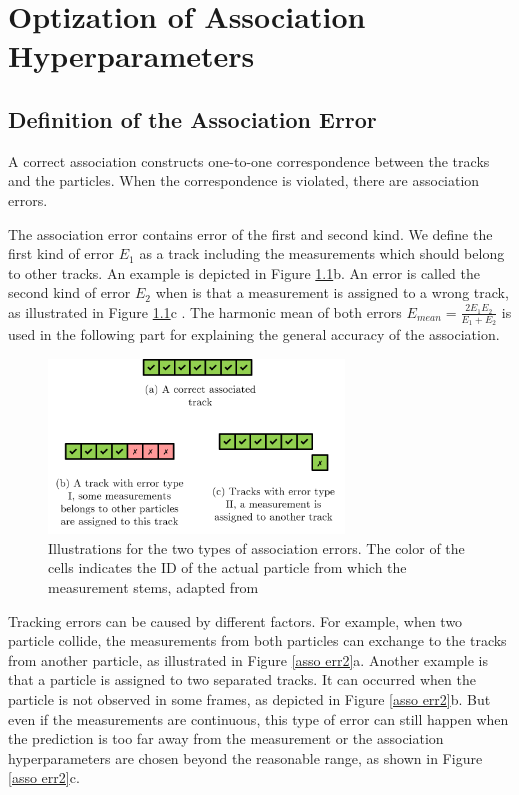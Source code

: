 \chapter{Optization of Association Hyperparameters}

\section{Definition of the Association Error}


A correct association constructs one-to-one correspondence between the tracks and the particles. When the correspondence is violated, there are association errors.

The association error contains error of the first and second kind. We define the first kind of error $E_{1}$ as a track including the measurements which should belong to other tracks. An example
is depicted in Figure \ref{asso err}b. An error is called the second kind of error $E_{2}$ when is that a measurement is assigned to a wrong track, as illustrated in Figure \ref{asso err}c \cite{pfaff2019multitarget}. The harmonic mean of both errors $E_{mean}=\frac{2E_{1}E_{2}}{E_{1}+E_{2}}$ is used in  the following part for explaining the general accuracy of the association. 


\begin{figure}[htbp]
\centering
\includegraphics[width=0.7\textwidth]{figures/Asso/association error.png}
\caption{Illustrations for the two types of association errors. The  color of the cells indicates the ID of the actual particle from which the measurement stems, adapted from \cite{pfaff2019multitarget}}
\label{asso err}
\end{figure}

Tracking errors can be caused by different factors. For example, when two particle collide, the measurements from both particles can exchange to the tracks from another particle, as illustrated in Figure \ref{asso err2}a. Another example is that a particle is assigned to two separated tracks. It can occurred when the particle is not observed in some frames, as depicted in Figure \ref{asso err2}b. But even if the measurements are continuous, this type of error can still happen when the prediction is too far away from the measurement or the association hyperparameters are chosen beyond the reasonable range, as shown in Figure \ref{asso err2}c. 

